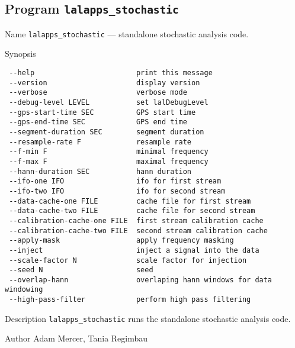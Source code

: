 \subsection{Program \texttt{lalapps\_stochastic}}
\label{program:lalapps-stochastic}

\begin{entry}
\item[Name]
\verb$lalapps_stochastic$ --- standalone stochastic analysis code.

\item[Synopsis]
\begin{verbatim}
 --help                        print this message
 --version                     display version
 --verbose                     verbose mode
 --debug-level LEVEL           set lalDebugLevel
 --gps-start-time SEC          GPS start time
 --gps-end-time SEC            GPS end time
 --segment-duration SEC        segment duration
 --resample-rate F             resample rate
 --f-min F                     minimal frequency
 --f-max F                     maximal frequency
 --hann-duration SEC           hann duration
 --ifo-one IFO                 ifo for first stream
 --ifo-two IFO                 ifo for second stream
 --data-cache-one FILE         cache file for first stream
 --data-cache-two FILE         cache file for second stream
 --calibration-cache-one FILE  first stream calibration cache
 --calibration-cache-two FILE  second stream calibration cache
 --apply-mask                  apply frequency masking
 --inject                      inject a signal into the data
 --scale-factor N              scale factor for injection
 --seed N                      seed
 --overlap-hann                overlaping hann windows for data windowing
 --high-pass-filter            perform high pass filtering
\end{verbatim}

\item[Description] \verb$lalapps_stochastic$ runs the standalone
stochastic analysis code.

\item[Author] 
Adam Mercer, Tania Regimbau
\end{entry}
